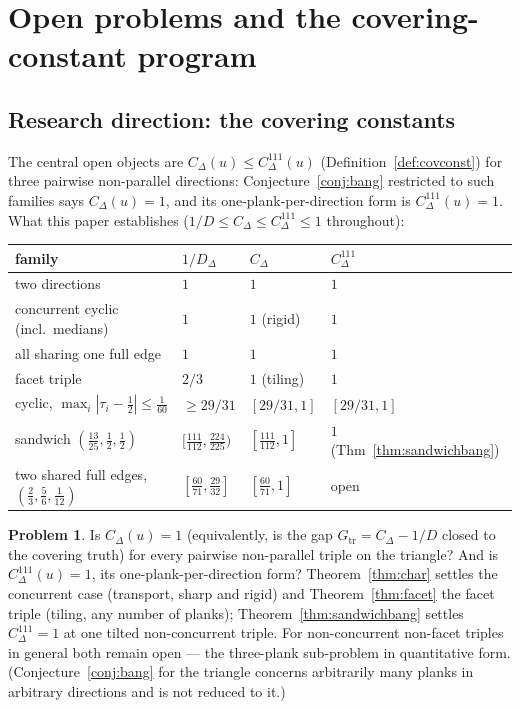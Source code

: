 \documentclass[11pt,reqno]{amsart}
\theoremstyle{plain}
\theoremstyle{definition}
\newtheorem{problem}[theorem]{Problem}
\theoremstyle{remark}
\begin{document}
\section{Open problems and the covering-constant program}
\label{sec:problems}

\subsection*{Research direction: the covering constants}
The central open objects are $C_\Delta(u)\le C^{111}_\Delta(u)$
(Definition~\ref{def:covconst}) for three pairwise non-parallel directions:
Conjecture~\ref{conj:bang} restricted to such families says $C_\Delta(u)=1$,
and its one-plank-per-direction form is $C^{111}_\Delta(u)=1$. What this paper
establishes ($1/D\le C_\Delta\le C^{111}_\Delta\le1$ throughout):

\begin{center}
\begin{tabular}{@{}llll@{}}
\hline
family & $1/D_\Delta$ & $C_\Delta$ & $C^{111}_\Delta$\\
\hline
two directions & $1$ & $1$ & $1$\\
concurrent cyclic (incl.\ medians) & $1$ & $1$ (rigid) & $1$\\
all sharing one full edge & $1$ & $1$ & $1$\\
facet triple & $2/3$ & $1$ (tiling) & $1$\\
cyclic, $\max_i|\tau_i-\tfrac12|\le\tfrac1{60}$ & $\ge29/31$ & $[29/31,1]$
 & $[29/31,1]$\\
sandwich $(\tfrac{13}{25},\tfrac12,\tfrac12)$ & $[\tfrac{111}{112},
\tfrac{224}{225})$ & $[\tfrac{111}{112},1]$ & $1$ (Thm~\ref{thm:sandwichbang})\\
two shared full edges, $(\tfrac23,\tfrac56,\tfrac1{12})$
 & $[\tfrac{60}{71},\tfrac{29}{32}]$ & $[\tfrac{60}{71},1]$ & open\\
\hline
\end{tabular}
\end{center}

\begin{problem}\label{prob:covconst}
Is $C_\Delta(u)=1$ (equivalently, is the gap $G_{\mathrm{tr}}=C_\Delta-1/D$
closed to the covering truth) for every pairwise non-parallel triple on the
triangle? And is $C^{111}_\Delta(u)=1$, its one-plank-per-direction form?
Theorem~\ref{thm:char} settles the concurrent case (transport, sharp and
rigid) and Theorem~\ref{thm:facet} the facet triple (tiling, any number of
planks); Theorem~\ref{thm:sandwichbang} settles $C^{111}_\Delta=1$ at one
tilted non-concurrent triple. For non-concurrent non-facet triples in general
both remain open --- the three-plank sub-problem in quantitative form.
(Conjecture~\ref{conj:bang} for the triangle concerns arbitrarily many planks
in arbitrary directions and is not reduced to it.)
\end{problem}
\end{document}
